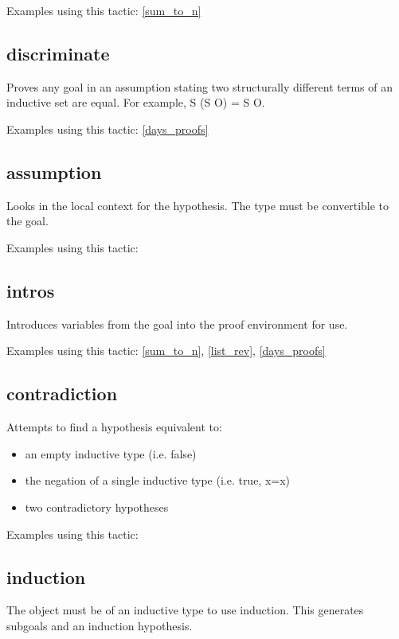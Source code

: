 \noindent
Examples using this tactic: 
\ref{sum_to_n}


\subsection{discriminate} \label{discriminate}
Proves any goal in an assumption stating two structurally different terms of an inductive set are equal. For example, S (S O) = S O.

\noindent
Examples using this tactic: 
\ref{days_proofs}



\subsection{assumption} \label{assumption}
Looks in the local context for the hypothesis. The type must be convertible to the goal.

\noindent
Examples using this tactic: 



\subsection{intros} \label{intros}
Introduces variables from the goal into the proof environment for use.

\noindent
Examples using this tactic: 
\ref{sum_to_n}, \ref{list_rev}, \ref{days_proofs}


\subsection{contradiction} \label{contradiction}
Attempts to find a hypothesis equivalent to:
\begin{itemize}
	\item an empty inductive type (i.e. false)
	\item the negation of a single inductive type (i.e. true, x=x)
	\item two contradictory hypotheses
\end{itemize}

\noindent
Examples using this tactic: 



\subsection{induction} \label{induction}
The object must be of an inductive type to use induction. 
This generates subgoals and an induction hypothesis.

